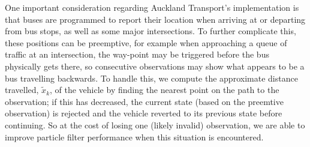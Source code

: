 One important consideration regarding Auckland Transport's \rt implementation is that
buses are programmed to report their location when arriving at or departing from
bus stops, as well as some major intersections.
To further complicate this,
these positions can be preemptive,
for example when approaching a queue of traffic at an intersection,
the way-point may be triggered before the bus physically gets there,
so consecutive observations may show what appears to be a bus travelling backwards.
To handle this, we compute the approximate distance travelled, $\tilde x_k$,
of the vehicle by finding the nearest point on the path to the observation;
if this has decreased, the current state (based on the preemtive observation)
is rejected and the vehicle reverted
to its previous state before continuing.
So at the cost of losing one (likely invalid) observation,
we are able to improve particle filter performance
when this situation is encountered.

